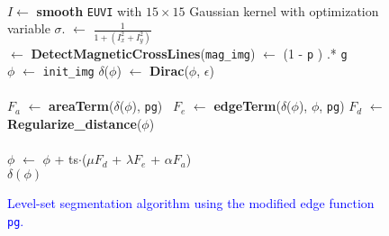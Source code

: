 \begin{figure}
	\color{blue}
	\begin{algorithmic}[0]
		\State {}
		\State {}\\
		\State $I \gets$ \textbf{smooth} {\tt EUVI} with $15\times 15$ Gaussian kernel
		\State \hspace{1.9cm} with optimization variable $\sigma$.
		   $\gets$ $\frac{1}{1+(I_x^2+I_y^2)}$ 
		~\\
		\State{} 
		   \hspace{2mm}$\gets$ \textbf{DetectMagneticCrossLines}({\tt mag\_img})
		 $\gets$ (1 - {\tt p} ) .* {\tt g} \\
		
		\State {}
		\State {}
		\State $\phi$ $\gets$ {\tt init\_img} 
		\State $\delta$($\phi$) $\gets$ \textbf{Dirac}($\phi$, $\epsilon$) \\
		~\\
		\hspace{0.5 true in}
		\State $F_a$ $\gets$ \textbf{areaTerm}($\delta$($\phi$), {\tt pg}) \
		\State $F_e$ $\gets$ \textbf{edgeTerm}($\delta$($\phi$), $\phi$, {\tt pg})
		\State $F_d$ $\gets$ \textbf{Regularize\_distance}($\phi$)\\
		~\\
		\hspace{0.5 true in}
		\State $\phi$ $\gets$ $\phi$ + ts$\cdot$($\mu F_d$ + $\lambda F_e$ + $\alpha F_a$)
		\EndFor \\
		 $\delta(\phi)$
		\EndFunction
	\end{algorithmic}
	\caption{\textcolor{blue}{
		Level-set segmentation algorithm using
		the modified edge function {\tt pg}.}}\label{fig:LevelSets}
\end{figure}